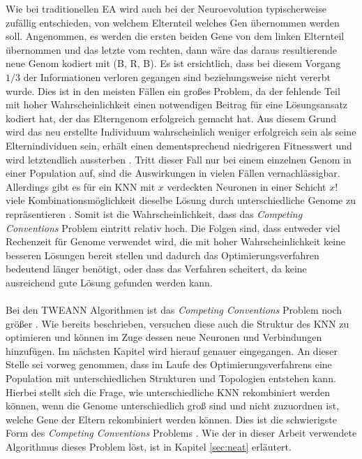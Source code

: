 Wie bei traditionellen \ac{EA} wird auch bei der Neuroevolution typischerweise zufällig entschieden, von welchem Elternteil welches Gen übernommen werden soll. Angenommen, es werden die ersten beiden Gene von dem linken Elternteil übernommen und das letzte vom rechten, dann wäre das daraus resultierende neue Genom kodiert mit (B, R, B). Es ist ersichtlich, dass bei diesem Vorgang $1/3$ der Informationen verloren gegangen sind beziehungsweise nicht vererbt wurde. Dies ist in den meisten Fällen ein großes Problem, da der fehlende Teil mit hoher Wahrscheinlichkeit einen notwendigen Beitrag für eine Lösungsansatz kodiert hat, der das Elterngenom erfolgreich gemacht hat. Aus diesem Grund wird das neu erstellte Individuum wahrscheinlich weniger erfolgreich sein als seine Elternindividuen sein, erhält einen dementsprechend niedrigeren Fitnesswert und wird letztendlich aussterben \cite{stanley2002evolving}. Tritt dieser Fall nur bei einem einzelnen Genom in einer Population auf, sind die Auswirkungen in vielen Fällen vernachlässigbar. Allerdings gibt es für ein \ac{KNN} mit $x$ verdeckten Neuronen in einer Schicht $x!$ viele Kombinationsmöglichkeit dieselbe Lösung durch unterschiedliche Genome zu repräsentieren \cite{stanley2002evolving}. Somit ist die Wahrscheinlichkeit, dass das \emph{Competing Conventions} Problem eintritt relativ hoch. Die Folgen sind, dass entweder viel Rechenzeit für Genome verwendet wird, die mit hoher Wahrscheinlichkeit keine besseren Lösungen bereit stellen und dadurch das Optimierungsverfahren bedeutend länger benötigt, oder dass das Verfahren scheitert, da keine ausreichend gute Lösung gefunden werden kann. 
\\\\
Bei den \ac{TWEANN} Algorithmen ist das \emph{Competing Conventions} Problem noch größer \cite{stanley2002evolving}. Wie bereits beschrieben, versuchen diese auch die Struktur des \ac{KNN} zu optimieren und können im Zuge dessen neue Neuronen und Verbindungen hinzufügen. Im nächsten Kapitel wird hierauf genauer eingegangen. An dieser Stelle sei vorweg genommen, dass im Laufe des Optimierungsverfahrens eine Population mit unterschiedlichen Strukturen und Topologien entstehen kann. Hierbei stellt sich die Frage, wie unterschiedliche \ac{KNN} rekombiniert werden können, wenn die Genome unterschiedlich groß sind und nicht zuzuordnen ist, welche Gene der Eltern rekombiniert werden können. Dies ist die schwierigste Form des \emph{Competing Conventions} Problems \cite{stanley2002evolving}. Wie der in dieser Arbeit verwendete Algorithmus dieses Problem löst, ist in Kapitel \ref{sec:neat} erläutert.

